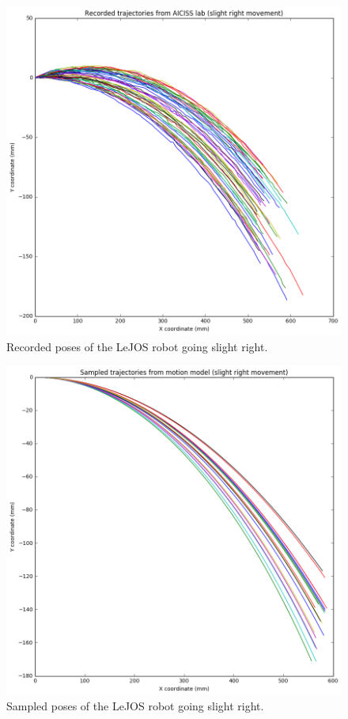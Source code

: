 \documentclass[paper=a4, fontsize=11pt]{scrartcl} %
\begin{document}
    \begin{figure}[h!]
        \begin{center}
            \setlength{\fboxsep}{0.5pt} %
            \setlength{\fboxrule}{0.5pt}
            \includegraphics[width=0.65\linewidth,fbox]{images/recorded_poses_slight_right.png}
            \caption{Recorded poses of the LeJOS robot going slight right.}
        \end{center}
    \end{figure}

    \begin{figure}[h!]
        \begin{center}
            \setlength{\fboxsep}{0.5pt} %
            \setlength{\fboxrule}{0.5pt}
            \includegraphics[width=0.65\linewidth,fbox]{images/sampled_poses_slightRight.png}
            \caption{Sampled poses of the LeJOS robot going slight right.}
        \end{center}
    \end{figure}
\end{document}
